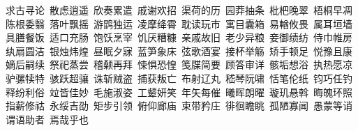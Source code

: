 求古寻论~散虑逍遥~欣奏累遣~戚谢欢招~渠荷的历~园莽抽条~枇杷晚翠~梧桐早凋\\
陈根委翳~落叶飘摇~游鹍独运~凌摩绛霄~耽读玩市~寓目囊箱~易輶攸畏~属耳垣墙\\
具膳餐饭~适口充肠~饱饫烹宰~饥厌糟糠~亲戚故旧~老少异粮~妾御绩纺~侍巾帷房\\
纨扇圆洁~银烛炜煌~昼眠夕寐~蓝笋象床~弦歌酒宴~接杯举觞~矫手顿足~悦豫且康\\
嫡后嗣续~祭祀蒸尝~稽颡再拜~悚惧恐惶~笺牒简要~顾答审详~骸垢想浴~执热愿凉\\
驴骡犊特~骇跃超骧~诛斩贼盗~捕获叛亡~布射辽丸~嵇琴阮啸~恬笔伦纸~钧巧任钓\\
释纷利俗~竝皆佳妙~毛施淑姿~工颦妍笑~年矢每催~曦晖朗曜~璇玑悬斡~晦魄环照\\
指薪修祜~永绥吉劭~矩步引领~俯仰廊庙~束带矜庄~徘徊瞻眺~孤陋寡闻~愚蒙等诮\\
谓语助者~焉哉乎也